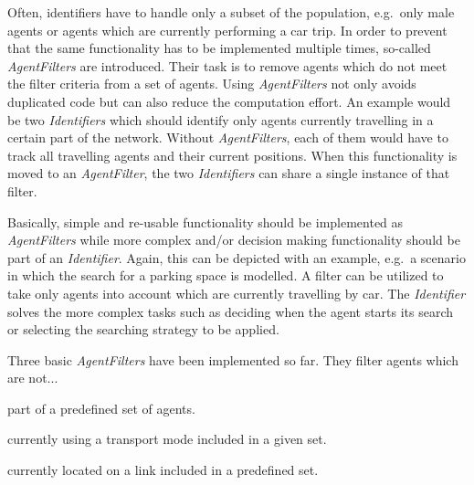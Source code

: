 
Often, identifiers have to handle only a subset of the population, e.g.~only male agents or agents which are currently performing a car trip. In order to prevent that the same functionality has to be implemented multiple times, so-called \textit{AgentFilters} are introduced. Their task is to remove agents which do not meet the filter criteria from a set of agents. Using \textit{AgentFilters} not only avoids duplicated code but can also reduce the computation effort. An example would be two \textit{Identifiers} which should identify only agents currently travelling in a certain part of the network. Without \textit{AgentFilters}, each of them would have to track all travelling agents and their current positions. When this functionality is moved to an \textit{AgentFilter}, the two \textit{Identifiers} can share a single instance of that filter.


Basically, simple and re-usable functionality should be implemented as \textit{AgentFilters} while more complex and/or decision making functionality should be part of an \textit{Identifier}. Again, this can be depicted with an example, e.g.\ a scenario in which the search for a parking space is modelled. A filter can be utilized to take only agents into account which are currently travelling by car. The \textit{Identifier} solves the more complex tasks such as deciding when the agent starts its search or selecting the searching strategy to be applied.


Three basic \emph{AgentFilters} have been implemented so far. They filter agents which are not...
\begin{compactitem}
    \item part of a predefined set of agents.
    \item currently using a transport mode included in a given set.
    \item currently located on a link included in a predefined set.
\end{compactitem}



